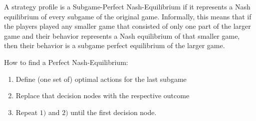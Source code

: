 \begin{definition}  
A strategy profile is a Subgame-Perfect Nash-Equilibrium if it represents a Nash equilibrium of every subgame of the original game. Informally, this means that if the players played any smaller game that consisted of only one part of the larger game and their behavior represents a Nash equilibrium of that smaller game, then their behavior is a subgame perfect equilibrium of the larger game. 

	How to find a Perfect Nash-Equilibrium:
	\begin{enumerate}
		\item Define (one set of) optimal actions for the last subgame
		\item Replace that decision nodes with the respective outcome
		\item Repeat $1)$ and $2)$ until the first decision node.
	\end{enumerate}
\end{definition}

